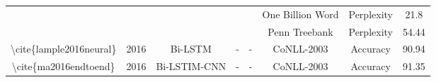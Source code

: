 \begin{table}[]
\begin{tabular}{|c|c|c|c|c|c|cc|}
                                                                                          &                                            &                                                   &                                                           &                                                                                                                        & One Billion Word                                      & Perplexity                                                                                                                         & 21.8                       \\ \cline{6-8} 
                                                                                          &                                            &                                                   &                                                           &                                                                                                                        & Penn Treebank                                         & Perplexity                                                                                                                         & 54.44                      \\ \hline
    \textbackslash{}cite\{lample2016neural\}                                              & 2016                                       & Bi-LSTM                                           & -                                                         & -                                                                                                                      & CoNLL-2003                                            & \multicolumn{1}{c|}{Accuracy}                                                                                                      & 90.94                      \\ \hline
    \textbackslash{}cite\{ma2016endtoend\}                                                & 2016                                       & Bi-LSTIM-CNN                                      & -                                                         & -                                                                                                                      & CoNLL-2003                                            & \multicolumn{1}{c|}{Accuracy}                                                                                                      & 91.35                      \\ \hline

\end{tabular}
\end{table}

